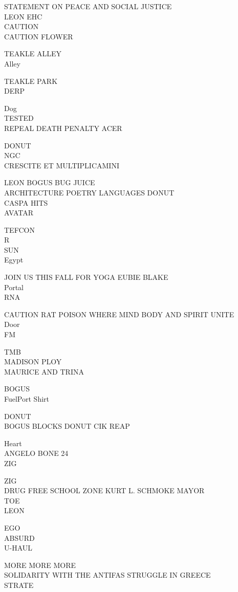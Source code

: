 \documentclass[10pt,letterpaper]{article}
\begin{document}
STATEMENT ON PEACE AND SOCIAL JUSTICE\\
LEON EHC\\
CAUTION\\
CAUTION FLOWER

TEAKLE ALLEY\\
Alley

TEAKLE PARK\\
DERP

Dog\\
TESTED\\
REPEAL DEATH PENALTY ACER

DONUT\\
NGC\\
CRESCITE ET MULTIPLICAMINI

LEON BOGUS BUG JUICE\\
ARCHITECTURE POETRY LANGUAGES DONUT\\
CASPA HITS\\
AVATAR

TEFCON\\
R\\
SUN\\
Egypt

JOIN US THIS FALL FOR YOGA EUBIE BLAKE\\
Portal\\
RNA

CAUTION RAT POISON WHERE MIND BODY AND SPIRIT UNITE\\
Door\\
FM

TMB\\
MADISON PLOY\\
MAURICE AND TRINA

BOGUS\\
FuelPort Shirt

DONUT\\
BOGUS BLOCKS DONUT CIK REAP

Heart\\
ANGELO BONE 24\\
ZIG

ZIG\\
DRUG FREE SCHOOL ZONE KURT L. SCHMOKE MAYOR\\
TOE\\
LEON

EGO\\
ABSURD\\
U{-}HAUL

MORE MORE MORE\\
SOLIDARITY WITH THE ANTIFAS STRUGGLE IN GREECE\\
STRATE
\end{document}

